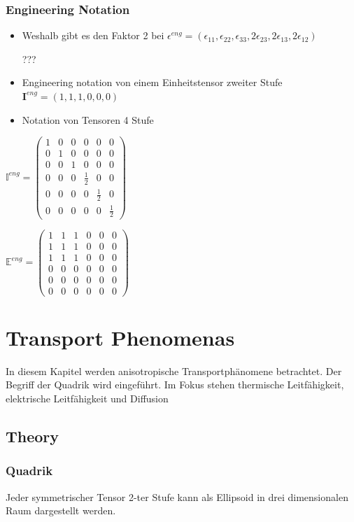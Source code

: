 \documentclass[a4paper]{scrartcl}
\begin{document}
\subsubsection{Engineering Notation}
\begin{itemize}
\item Weshalb gibt es den Faktor 2 bei $ \epsilon^{eng}=(\epsilon_{11},\epsilon_{22},\epsilon_{33},2\epsilon_{23},2\epsilon_{13},2\epsilon_{12}) $

???


\item Engineering notation von einem Einheitstensor zweiter Stufe
$ \textbf{I}^{eng}=(1,1,1,0,0,0) $


\item Notation von Tensoren 4 Stufe

\end{itemize}
$ \mathbb{I}^{eng}=
\begin{pmatrix}
1 & 0 & 0 & 0 & 0 & 0 \\ 
0 & 1 & 0 & 0 & 0 & 0 \\ 
0 & 0 & 1 & 0 & 0 & 0 \\ 
0 & 0 & 0 & \frac{1}{2} & 0 & 0 \\ 
0 & 0 & 0 & 0 & \frac{1}{2} & 0 \\ 
0 & 0 & 0 & 0 & 0 & \frac{1}{2}
\end{pmatrix} 
$

$
\mathbb{E}^{eng}=
\begin{pmatrix}
1 & 1 & 1 & 0 & 0 & 0 \\ 
1 & 1 & 1 & 0 & 0 & 0 \\ 
1 & 1 & 1 & 0 & 0 & 0 \\ 
0 & 0 & 0 & 0 & 0 & 0 \\ 
0 & 0 & 0 & 0 & 0 & 0 \\ 
0 & 0 & 0 & 0 & 0 & 0
\end{pmatrix} 
$

\section{Transport Phenomenas}
In diesem Kapitel werden anisotropische Transportphänomene betrachtet. Der
Begriff der Quadrik wird eingeführt. Im Fokus stehen thermische Leitfähigkeit,
elektrische Leitfähigkeit und Diffusion
\subsection{Theory}
\subsubsection{Quadrik}
Jeder symmetrischer Tensor 2-ter Stufe kann als Ellipsoid in drei dimensionalen
Raum dargestellt werden.
\end{document}

